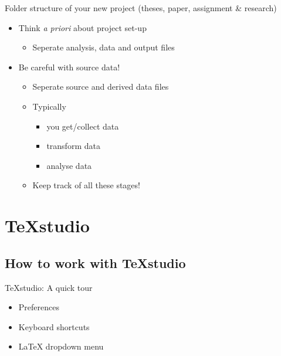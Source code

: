 \documentclass[ignorenonframetext]{beamer}
\begin{document}
{\begin{frame}{Folder structure of your new project (theses, paper, assignment \& research)}

\begin{itemize}
\item
  Think \emph{a priori} about project set-up

  \begin{itemize}
  \item
    Seperate analysis, data and output files
  \end{itemize}
\item
  Be careful with source data!

  \begin{itemize}
  \item
    Seperate source and derived data files
  \item
    Typically

    \begin{itemize}
    \item
      you get/collect data
    \item
      transform data
    \item
      analyse data
    \end{itemize}
  \item
    Keep track of all these stages!
  \end{itemize}
\end{itemize}
\end{frame}


\section{TeXstudio}

\subsection{How to work with TeXstudio}

\begin{frame}{TeXstudio: A quick tour}
	\begin{itemize}
		\item Preferences
		\newline
		\item Keyboard shortcuts
		\newline
		\item LaTeX dropdown menu
	\end{itemize}
\end{frame}

}
\end{document}
